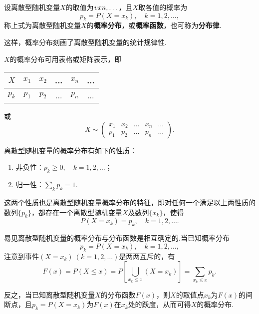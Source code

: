 \begin{definition}
设离散型随机变量\(X\)的取值为\(v{x}{n},\dotsc\)，且\(X\)取各值的概率为\[
p_k = P(X=x_k), \quad k=1,2,\dotsc,
\]称上式为离散型随机变量\(X\)的\textbf{概率分布}，或\textbf{概率函数}，也可称为\textbf{分布律}.
\end{definition}

这样，概率分布刻画了离散型随机变量的统计规律性.

\(X\)的概率分布可用表格或矩阵表示，即
\begin{center}
\begin{tabular}{c|*{5}{c}}
\hline
\(X\) & \(x_1\) & \(x_2\) & ... & \(x_n\) & ... \\ \hline
\(p_k\) & \(p_1\) & \(p_2\) & ... & \(p_n\) & ... \\ \hline
\end{tabular}
\end{center}
或
\[
X \sim \begin{pmatrix}
x_1 & x_2 & \dots & x_n & \dots \\
p_1 & p_2 & \dots & p_n & \dots
\end{pmatrix}.
\]

\begin{property}\label{theorem:随机变量及其分布.离散型随机变量的密度函数的性质}
离散型随机变量的概率分布有如下的性质：
\begin{enumerate}
\item 非负性：\(p_k \geqslant 0, \quad k = 1,2,\dots\)；
\item 归一性：\(\sum\limits_{k}{p_k} = 1\).
\end{enumerate}
\end{property}

这两个性质也是离散型随机变量概率分布的特征，即对任何一个满足以上两性质的数列\(\{p_k\}\)，都存在一个离散型随机变量\(X\)及数列\(\{x_k\}\)，使得\[
P(X=x_k) = p_k,
\quad k=1,2,\dotsc.
\]

易见离散型随机变量的概率分布与分布函数是相互确定的.当已知概率分布\[
p_k = P(X=x_k),
\quad k=1,2,\dotsc,
\]注意到事件\((X=x_k)\ (k=1,2,\dotsc)\)是两两互斥的，有\begin{equation}
F(x) = P(X \leqslant x)
= P\left[ \bigcup_{x_k \leqslant x} (X = x_k) \right]
= \sum\limits_{x_k \leqslant x} p_k.
\end{equation}

反之，当已知离散型随机变量\(X\)的分布函数\(F(x)\)，则\(X\)的取值点\(x_k\)为\(F(x)\)的间断点，且\(p_k = P(X=x_k)\)为\(F(x)\)在\(x_k\)处的跃度，从而可得\(X\)的概率分布.

